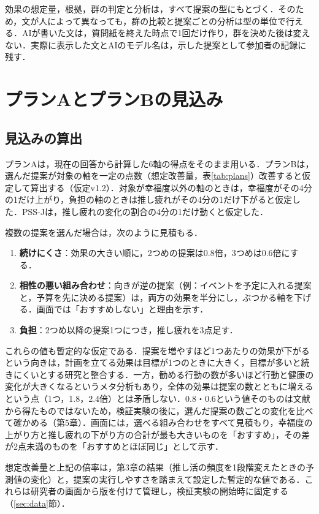 効果の想定量，根拠，群の判定と分析は，すべて提案の型にもとづく．そのため，文が人によって異なっても，群の比較と提案ごとの分析は型の単位で行える．AIが書いた文は，質問紙を終えた時点で1回だけ作り，群を決めた後は変えない．実際に表示した文とAIのモデル名は，示した提案として参加者の記録に残す．

\section{プランAとプランBの見込み}
\subsection{見込みの算出}
プランAは，現在の回答から計算した6軸の得点をそのまま用いる．プランBは，選んだ提案が対象の軸を一定の点数（想定改善量，表\ref{tab:plans}）改善すると仮定して算出する（仮定v1.2）．対象が幸福度以外の軸のときは，幸福度がその4分の1だけ上がり，負担の軸のときは推し疲れがその4分の1だけ下がると仮定した．PSS-Jは，推し疲れの変化の割合の4分の1だけ動くと仮定した．

複数の提案を選んだ場合は，次のように見積もる．
\begin{enumerate}
\item \textbf{続けにくさ}：効果の大きい順に，2つめの提案は0.8倍，3つめは0.6倍にする．
\item \textbf{相性の悪い組み合わせ}：向きが逆の提案（例：イベントを予定に入れる提案と，予算を先に決める提案）は，両方の効果を半分にし，ぶつかる軸を下げる．画面では「おすすめしない」と理由を示す．
\item \textbf{負担}：2つめ以降の提案1つにつき，推し疲れを3点足す．
\end{enumerate}
これらの値も暫定的な仮定である．提案を増やすほど1つあたりの効果が下がるという向きは，計画を立てる効果は目標が1つのときに大きく，目標が多いと続きにくいとする研究\cite{dalton2012}と整合する．一方，勧める行動の数が多いほど行動と健康の変化が大きくなるというメタ分析\cite{zhang2024}もあり，全体の効果は提案の数とともに増えるという点（1つ，1.8，2.4倍）とは矛盾しない．0.8・0.6という値そのものは文献から得たものではないため，検証実験の後に，選んだ提案の数ごとの変化を比べて確かめる（第5章）．画面には，選べる組み合わせをすべて見積もり，幸福度の上がり方と推し疲れの下がり方の合計が最も大きいものを「おすすめ」，その差が2点未満のものを「おすすめとほぼ同じ」として示す．

想定改善量と上記の倍率は，第3章の結果（推し活の頻度を1段階変えたときの予測値の変化）と，提案の実行しやすさを踏まえて設定した暫定的な値である．これらは研究者の画面から版を付けて管理し，検証実験の開始時に固定する（\ref{sec:data}節）．

